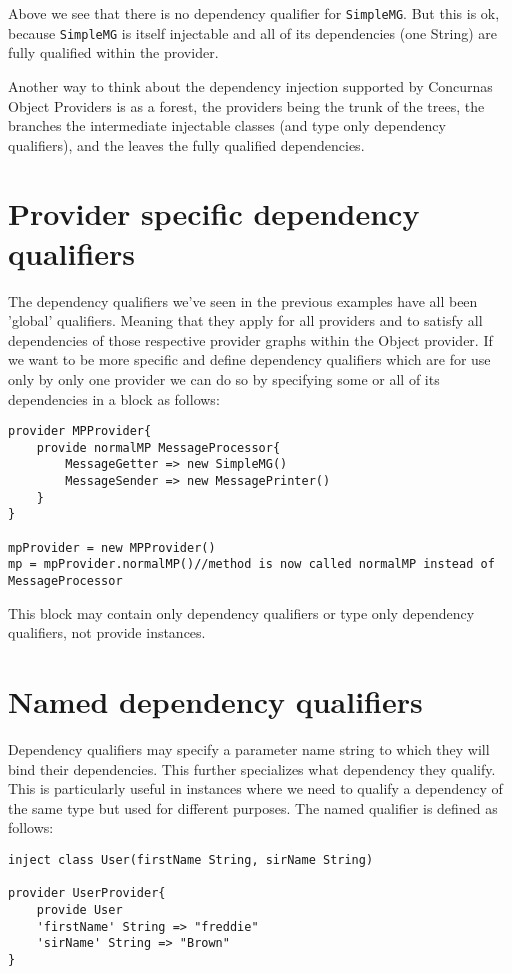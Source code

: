 \documentclass[conc-doc]{subfiles}
\begin{document}
Above we see that there is no dependency qualifier for \lstinline{SimpleMG}. But this is ok, because \lstinline{SimpleMG} is itself injectable and all of its dependencies (one String) are fully qualified within the provider.

Another way to think about the dependency injection supported by Concurnas Object Providers is as a forest, the providers being the trunk of the trees, the branches the intermediate injectable classes (and type only dependency qualifiers), and the leaves the fully qualified dependencies. 

\section{Provider specific dependency qualifiers}
The dependency qualifiers we've seen in the previous examples have all been 'global' qualifiers. Meaning that they apply for all providers and to satisfy all dependencies of those respective provider graphs within the Object provider. If we want to be more specific and define dependency qualifiers which are for use only by only one provider we can do so by specifying some or all of its dependencies in a block as follows:

\begin{lstlisting}
provider MPProvider{
	provide normalMP MessageProcessor{
		MessageGetter => new SimpleMG()
		MessageSender => new MessagePrinter()
	}
}

mpProvider = new MPProvider()
mp = mpProvider.normalMP()//method is now called normalMP instead of MessageProcessor
\end{lstlisting}

This block may contain only dependency qualifiers or type only dependency qualifiers, not provide instances.

\section{Named dependency qualifiers}
Dependency qualifiers may specify a parameter name string to which they will bind their dependencies. This further specializes what dependency they qualify. This is particularly useful in instances where we need to qualify a dependency of the same type but used for different purposes. The named qualifier is defined as follows:
\begin{lstlisting}
inject class User(firstName String, sirName String)

provider UserProvider{
	provide User
	'firstName' String => "freddie"
	'sirName' String => "Brown"
}
\end{lstlisting}
\end{document}
